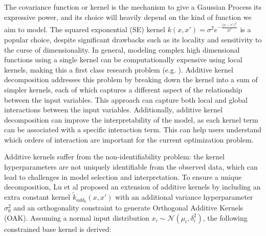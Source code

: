 \documentclass{IOS-Book-Article}
\begin{document}
	The covariance function or kernel is the mechanism to give a Gaussian Process its expressive power, and its choice will heavily depend on the kind of function we aim to model\cite{kernel-composition}. The squared exponential (SE) kernel $k(x,x') = \sigma^2 e^{-\frac{||x-x'||^2}{2l^2}}$ is a popular choice, despite significant drawbacks such as its locality and sensitivity to the curse of dimensionality\cite{curse-dimensionality}.
	In general, modeling complex high dimensional functions using a single kernel can be computationally expensive using local kernels, making this a first class research problem (e.g. \cite{gp-high-dim}\cite{gp-high-dim2}).
	Additive kernel decomposition\cite{gp-additive} addresses this problem by breaking down the kernel into a sum of simpler kernels, each of which captures a different aspect of the relationship between the input variables. This approach can capture both local and global interactions between the input variables. Additionally, additive kernel decomposition can improve the interpretability of the model, as each kernel term can be associated with a specific interaction term. This can help users understand which orders of interaction are important for the current optimization problem. 
	
	
	
	
	Additive kernels suffer from the non-identifiability problem: the kernel hyperparameters are not uniquely identifiable from the observed data, which can lead to challenges in model selection and interpretation.
	To ensure a unique decomposition, Lu et al\cite{gp-additive-orthogonal} proposed an extension of additive kernels by including an extra constant kernel $\tilde{k}_{add_0}(x,x')$ with an additional variance hyperparameter $\sigma_0^2$ and an orthogonality constraint to generate Orthogonal Additive Kernels (OAK)\cite{gp-additive-orthogonal}. Assuming a normal input distribution $x_i \sim \mathcal{N}(\mu_i, \delta_i^2)$, the following constrained base kernel is derived:
	
\end{document}
